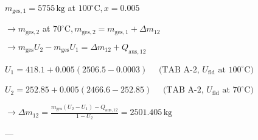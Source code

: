 \( m_{\text{ges},1} = 5755 \, \text{kg} \) at \( 100^\circ \text{C}, x = 0.005 \)  

\( \rightarrow m_{\text{ges},2} \) at \( 70^\circ \text{C}, m_{\text{ges},2} = m_{\text{ges},1} + \Delta m_{12} \)  

\( \rightarrow m_{\text{ges}} U_2 - m_{\text{ges}} U_1 = \Delta m_{12} + Q_{\text{aus},12} \)  

\( U_1 = 418.1 + 0.005 (2506.5 - 0.0003) \)  
\( \quad \text{(TAB A-2, } U_{\text{fld}} \text{ at } 100^\circ \text{C}) \)  

\( U_2 = 252.85 + 0.005 (2466.6 - 252.85) \)  
\( \quad \text{(TAB A-2, } U_{\text{fld}} \text{ at } 70^\circ \text{C}) \)  

\( \rightarrow \Delta m_{12} = \frac{m_{\text{ges}} (U_2 - U_1) - Q_{\text{aus},12}}{1 - U_2} = 2501.405 \, \text{kg} \)  

---